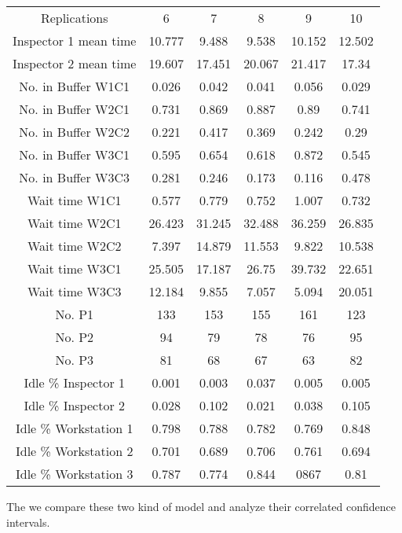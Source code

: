 \documentclass{article}
\begin{document}
\begin{table}[htp]
\begin{center}
\begin{tabular}{cccccc}
\hline
Replications & 6 & 7 & 8 & 9 & 10\\
Inspector 1 mean time&10.777&9.488&9.538&10.152&12.502\\
Inspector 2 mean time&19.607&17.451&20.067&21.417&17.34\\
No. in Buffer W1C1&0.026&0.042&0.041&0.056&0.029\\
No. in Buffer W2C1&0.731&0.869&0.887&0.89&0.741\\
No. in Buffer W2C2&0.221&0.417&0.369&0.242&0.29\\
No. in Buffer W3C1&0.595&0.654&0.618&0.872&0.545\\
No. in Buffer W3C3&0.281&0.246&0.173&0.116&0.478\\
Wait time W1C1&0.577&0.779&0.752&1.007&0.732\\
Wait time W2C1&26.423&31.245&32.488&36.259&26.835\\
Wait time W2C2&7.397&14.879&11.553&9.822&10.538\\
Wait time W3C1&25.505&17.187&26.75&39.732&22.651\\
Wait time W3C3&12.184&9.855&7.057&5.094&20.051\\
No. P1&133&153&155&161&123\\
No. P2&94&79&78&76&95\\
No. P3&81&68&67&63&82\\
Idle \% Inspector 1&0.001&0.003&0.037&0.005&0.005\\
Idle \% Inspector 2&0.028&0.102&0.021&0.038&0.105\\
Idle \% Workstation 1&0.798&0.788&0.782&0.769&0.848\\
Idle \% Workstation 2&0.701&0.689&0.706&0.761&0.694\\
Idle \% Workstation 3&0.787&0.774&0.844&0867&0.81\\
\hline

\end{tabular}
\end{center}
\label{default}
\end{table}%
The we compare these two kind of model and analyze their correlated confidence intervals.
\end{document}

